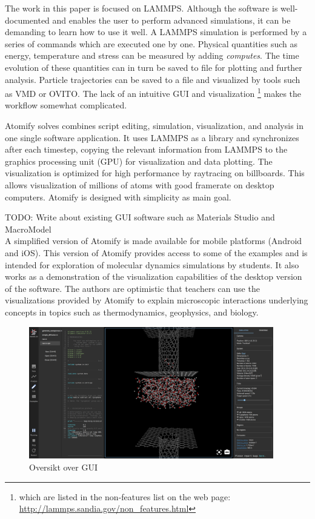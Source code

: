 \documentclass[aps,pre,twocolumn,letterpaper,floatfix]{revtex4}
\begin{document}
The work in this paper is focused on LAMMPS.
Although the software is well-documented and enables the user to perform
advanced simulations, it can be demanding to learn how to use it well.
A LAMMPS simulation is performed by a series of commands which are executed one by
one.
Physical quantities such as energy, temperature and stress can be measured by
adding \textit{computes}.
The time evolution of these quantities can in turn be saved to file for plotting
and further analysis.
Particle trajectories can be saved to a file and visualized by tools such as
VMD\cite{Humphrey1996Vmd} or OVITO\cite{Stukowski2009Visualization}.
The lack of an intuitive GUI and visualization \footnote{which are listed in the
non-features list on the web page:
\url{http://lammps.sandia.gov/non_features.html}} makes the workflow somewhat
complicated.

Atomify solves combines script editing, simulation,
visualization, and analysis in one single software application.
It uses LAMMPS as a library and synchronizes after each timestep,
copying the relevant information from LAMMPS to the graphics processing unit
(GPU) for visualization and data plotting.
The visualization is optimized for high performance by raytracing on billboards.
This allows visualization of millions of atoms with good framerate on desktop
computers. Atomify is designed with simplicity as main goal.

TODO: Write about existing GUI software such as Materials Studio and MacroModel \\

A simplified version of Atomify is made available for mobile platforms (Android
and iOS).
This version of Atomify provides access to some of the examples and is intended
for exploration of molecular dynamics simulations by students.
It also works as a demonstration of the visualization capabilities of the
desktop version of the software.
The authors are optimistic that teachers can use the visualizations provided by
Atomify to explain microscopic interactions underlying concepts in topics such
as thermodynamics, geophysics, and biology.
\begin{figure}
	\centering
	\includegraphics[width=0.95\textwidth]{gui.png}
	\caption{Oversikt over GUI}
	\label{fig:gui}
\end{figure}
\end{document}
